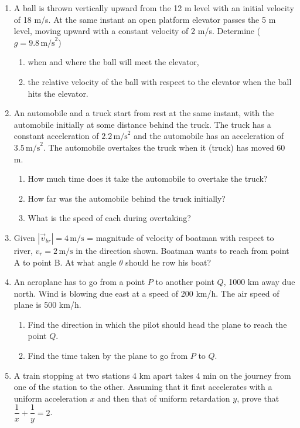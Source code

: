 \documentclass{article}
\renewcommand{\frac}[2]{\dfrac{#1}{#2}}
\begin{document}
\begin{enumerate}
    \item A ball is thrown vertically upward from the 12 m level with an initial velocity of 18 m/s. At the same instant an open platform elevator passes the 5 m level, moving upward with a constant velocity of 2 m/s. Determine (\( g = 9.8 \, \text{m/s}^2 \))
    \begin{enumerate}
        \item when and where the ball will meet the elevator,
        \item the relative velocity of the ball with respect to the elevator when the ball hits the elevator.
    \end{enumerate}
    
    \item An automobile and a truck start from rest at the same instant, with the automobile initially at some distance behind the truck. The truck has a constant acceleration of \( 2.2 \, \text{m/s}^2 \) and the automobile has an acceleration of \( 3.5 \, \text{m/s}^2 \). The automobile overtakes the truck when it (truck) has moved 60 m.
    \begin{enumerate}
        \item How much time does it take the automobile to overtake the truck?
        \item How far was the automobile behind the truck initially?
        \item What is the speed of each during overtaking?
    \end{enumerate}

    \item Given \( |\vec{v}_{br}| = 4 \, \text{m/s} \) = magnitude of velocity of boatman with respect to river, \( v_r = 2 \, \text{m/s} \) in the direction shown. Boatman wants to reach from point A to point B. At what angle \(\theta\) should he row his boat?

    \begin{center}
    \end{center}
    
    \item An aeroplane has to go from a point \( P \) to another point \( Q \), 1000 km away due north. Wind is blowing due east at a speed of 200 km/h. The air speed of plane is 500 km/h.
    \begin{enumerate}
        \item Find the direction in which the pilot should head the plane to reach the point \( Q \).
        \item Find the time taken by the plane to go from \( P \) to \( Q \).
    \end{enumerate}

    \item A train stopping at two stations 4 km apart takes 4 min on the journey from one of the station to the other. Assuming that it first accelerates with a uniform acceleration \( x \) and then that of uniform retardation \( y \), prove that \( \frac{1}{x} + \frac{1}{y} = 2 \).
\end{enumerate}
\end{document}

